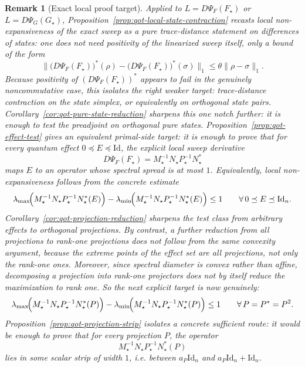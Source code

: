 \documentclass[11pt]{article}
\newcommand{\Id}{\mathrm{Id}}
\theoremstyle{plain}
\newtheorem{remark}{Remark}[section]
\begin{document}
\begin{remark}[Exact local proof target]
\label{rem:qot-local-proof-target}
Applied to $L=D\Psi_F(F_\star)$ or $L=D\Psi_G(G_\star)$, Proposition~\ref{prop:qot-local-state-contraction}
recasts local non-expansiveness of the exact sweep as a pure trace-distance statement on \emph{differences of states}:
one does not need positivity of the linearized sweep itself, only a bound of the form
\[
\bigl\|
\bigl(D\Psi_F(F_\star)\bigr)^\ast(\rho)
-
\bigl(D\Psi_F(F_\star)\bigr)^\ast(\sigma)
\bigr\|_1
\le
\theta \|\rho-\sigma\|_1.
\]
Because positivity of $(D\Psi_F(F_\star))^\ast$ appears to fail in the genuinely noncommutative case, this isolates the right weaker target:
trace-distance contraction on the state simplex, or equivalently on orthogonal state pairs.
Corollary~\ref{cor:qot-pure-state-reduction} sharpens this one notch further:
it is enough to test the preadjoint on orthogonal \emph{pure} states.
Proposition~\ref{prop:qot-effect-test} gives an equivalent primal-side target:
it is enough to prove that for every quantum effect $0\preceq E\preceq \Id$,
the explicit local sweep derivative
\[
D\Psi_F(F_\star)=M_\star^{-1}N_\star P_\star^{-1}N_\star^\ast
\]
maps $E$ to an operator whose spectral spread is at most $1$.
Equivalently, local non-expansiveness follows from the concrete estimate
\[
\lambda_{\max}\!\Bigl(M_\star^{-1}N_\star P_\star^{-1}N_\star^\ast(E)\Bigr)
-
\lambda_{\min}\!\Bigl(M_\star^{-1}N_\star P_\star^{-1}N_\star^\ast(E)\Bigr)
\le 1
\qquad
\forall\, 0\preceq E\preceq \Id_n.
\]
Corollary~\ref{cor:qot-projection-reduction} sharpens the test class from arbitrary effects to orthogonal projections.
By contrast, a further reduction from all projections to rank-one projections does \emph{not} follow from the same convexity argument, because the extreme points of the effect set are all projections, not only the rank-one ones.
Moreover, since spectral diameter is convex rather than affine, decomposing a projection into rank-one projectors does not by itself reduce the maximization to rank one.
So the next explicit target is now genuinely:
\[
\lambda_{\max}\!\Bigl(M_\star^{-1}N_\star P_\star^{-1}N_\star^\ast(P)\Bigr)
-
\lambda_{\min}\!\Bigl(M_\star^{-1}N_\star P_\star^{-1}N_\star^\ast(P)\Bigr)
\le 1
\qquad
\forall\, P=P^\ast=P^2.
\]
Proposition~\ref{prop:qot-projection-strip} isolates a concrete sufficient route:
it would be enough to prove that for every projection $P$, the operator
\[
M_\star^{-1}N_\star P_\star^{-1}N_\star^\ast(P)
\]
lies in some scalar strip of width $1$, i.e. between $a_P\Id_n$ and $a_P\Id_n+\Id_n$.

\end{remark}
\end{document}
